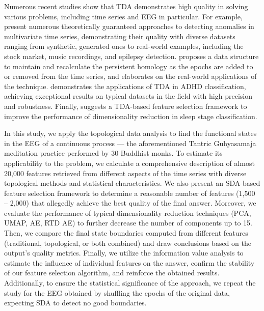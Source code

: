 \documentclass[10pt]{iopart}
\begin{document}
Numerous recent studies show that TDA demonstrates high quality in solving various problems, including time series and EEG in particular. For example, \cite{chazal2024topologicalanalysisdetectinganomalies,rai2024identifyingextremeeventsstock,heo2024persistenthomologyfeaturedtime,chrétien2024timetopologicalanalysiseeg} present numerous theoretically guaranteed approaches to detecting anomalies in multivariate time series, demonstrating their quality with diverse datasets ranging from synthetic, generated ones to real-world examples, including the stock market, music recordings, and epilepsy detection. \cite{dimontesano2024dynamicallymaintainingpersistenthomology} proposes a data structure to maintain and recalculate the persistent homology as the epochs are added to or removed from the time series, and \cite{ost2024bananatreespersistencetime} elaborates on the real-world applications of the technique.  \cite{cai2024topologicalfeaturesearchmethod} demonstrates the applications of TDA in ADHD classification, achieving exceptional results on typical datasets in the field with high precision and robustness. Finally, \cite{deng2024twostagehierarchicalexplainablefeature} suggests a TDA-based feature selection framework to improve the performance of dimensionality reduction in sleep stage classification.

In this study, we apply the topological data analysis to find the functional states in the EEG of a continuous process --- the aforementioned Tantric Guhyasamaja meditation practice performed by 30 Buddhist monks. To estimate its applicability to the problem, we calculate a comprehensive description of almost 20,000 features retrieved from different aspects of the time series with diverse topological methods and statistical characteristics. We also present an SDA-based feature selection framework to determine a reasonable number of features (1,500 -- 2,000) that allegedly achieve the best quality of the final answer. Moreover, we evaluate the performance of typical dimensionality reduction techniques (PCA, UMAP, AE, RTD AE) to further decrease the number of components up to 15. Then, we compare the final state boundaries computed from different features (traditional, topological, or both combined) and draw conclusions based on the output's quality metrics. Finally, we utilize the information value analysis to estimate the influence of individual features on the answer, confirm the stability of our feature selection algorithm, and reinforce the obtained results. Additionally, to ensure the statistical significance of the approach, we repeat the study for the EEG obtained by shuffling the epochs of the original data, expecting SDA to detect no good boundaries.
\end{document}

